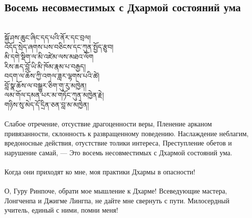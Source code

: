 \subsection*{Восемь несовместимых с Дхармой состояний ума}
\\
\ti
སྐྱོ་ཤས་ཆུང་ཞིང་དད་པའི་ནོར་དང་བྲལ། \\
འདོད་སྲེད་ཞགས་པས་བཅིངས་དང་ཀུན་སྤྱོད་རྩུབ། \\
མི་དགེ་སྡིག་ལ་མི་འཛེམ་ལས་མཐའ་ལོག \\
རིས་ཆད་བློ་ཡི་མི་ཁོམ་རྣམ་པ་བརྒྱད། \\
བདག་ལ་ཆོས་ཀྱི་འགལ་ཟླར་ལྷགས་པའི་ཚེ། \\
བློ་སྣ་ཆོས་ལ་བསྒྱུར་ཅིག་གུ་རུ་མཁྱེན། \\
ལམ་གོལ་དམན་པར་མ་གཏོང་ཀུན་མཁྱེན་རྗེ། \\
གཉིས་སུ་མེད་དོ་དྲིན་ཅན་བླ་མ་མཁྱེན། \\
\\
\ru
Слабое отречение, отсуствие драгоценности веры,
Пленение арканом привязанности, склонность к развращенному поведению.
Наслаждение неблагим, вредоносные действия, отустствие толики интереса,
Преступление обетов и нарушение самай, —
Это восемь несовместимых с Дхармой состояний ума.\\
\\
Когда они приходят ко мне, моя практики Дхармы в опасности!\\
\\
О, Гуру Ринпоче, обрати мое мышление к Дхарме!
Всеведующие мастера, Лонгченпа и Джигме Лингпа, не дайте
мне свернуть с пути. Милосердный учитель, единый с ними, помни меня!

\newpage
